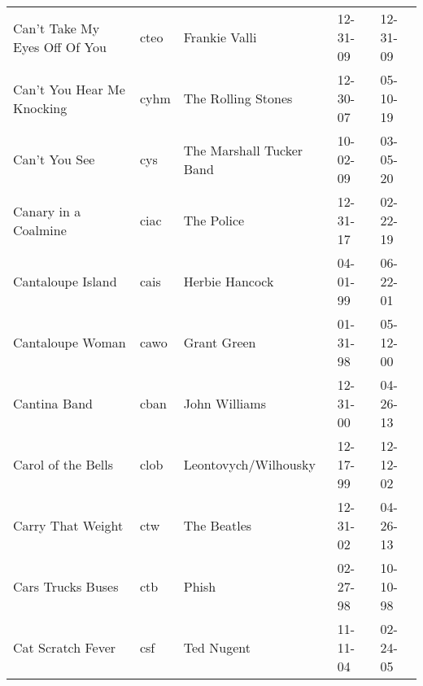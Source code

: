 \begin{longtable}{p{}p{}p{}p{}p{}}
                                           Can't Take My Eyes Off Of You &          cteo &                                            Frankie Valli &              12-31-09 &             12-31-09 \\
                                              Can't You Hear Me Knocking &          cyhm &                                       The Rolling Stones &              12-30-07 &             05-10-19 \\
                                                           Can't You See &           cys &                                 The Marshall Tucker Band &              10-02-09 &             03-05-20 \\
                                                    Canary in a Coalmine &          ciac &                                               The Police &              12-31-17 &             02-22-19 \\
                                                       Cantaloupe Island &          cais &                                           Herbie Hancock &              04-01-99 &             06-22-01 \\
                                                        Cantaloupe Woman &          cawo &                                              Grant Green &              01-31-98 &             05-12-00 \\
                                                            Cantina Band &          cban &                                            John Williams &              12-31-00 &             04-26-13 \\
                                                      Carol of the Bells &          clob &                                     Leontovych/Wilhousky &              12-17-99 &             12-12-02 \\
                                                       Carry That Weight &           ctw &                                              The Beatles &              12-31-02 &             04-26-13 \\
                                                       Cars Trucks Buses &           ctb &                                                    Phish &              02-27-98 &             10-10-98 \\
                                                       Cat Scratch Fever &           csf &                                               Ted Nugent &              11-11-04 &             02-24-05 \\

\end{longtable}
